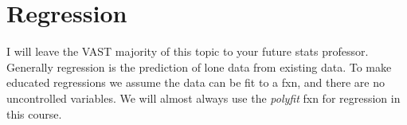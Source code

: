 \documentclass[12pt]{article}
\begin{document}
	\section{Regression}
		I will leave the VAST majority of this topic to your future stats professor.
		Generally regression is the prediction of lone data from existing data.
		To make educated regressions we assume the data can be fit to a fxn,
			and there are no uncontrolled variables.
		We will almost always use the \textit{polyfit} fxn for regression in this course.
		


	\nocite{*}

	\newpage %
	\backmatter
	\printbibliography

	\newpage %
	\printindex

	\newpage %
	\appendix
\end{document}
